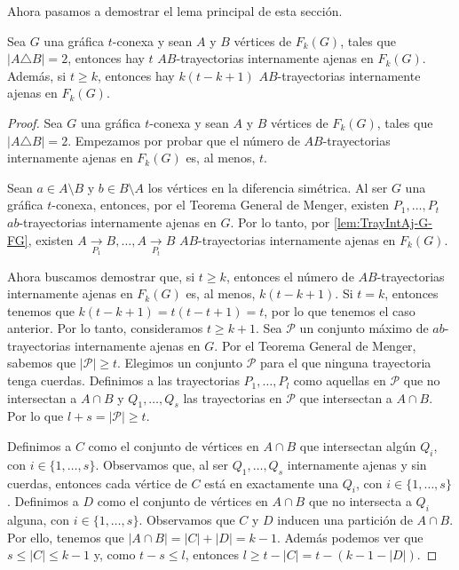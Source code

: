 Ahora pasamos a demostrar el lema principal de esta secci\'on.

\begin{lema}%
\label{lem:TrayIntAj}
    Sea $G$ una gr\'afica $t$-conexa y sean $A$ y $B$ v\'ertices de $F_{k}(G)$,
    tales que $|A \triangle B| = 2$, entonces hay $t$ $AB$-trayectorias
    internamente ajenas en $F_{k}(G)$. Adem\'as, si $t \geq k$, entonces hay
    $k(t- k + 1)$ $AB$-trayectorias internamente ajenas en $F_{k}(G)$.
\end{lema}

\begin{proof}
    Sea $G$ una gr\'afica $t$-conexa y sean $A$ y $B$ v\'ertices de $F_{k}(G)$,
    tales que $|A \triangle B| = 2$. Empezamos por probar que el n\'umero de
    $AB$-trayectorias internamente ajenas en $F_{k}(G)$ es, al menos, $t$. 
    
    Sean $a \in A \setminus B$ y $b \in B \setminus A$ los v\'ertices en la
    diferencia sim\'etrica. Al ser $G$ una gr\'afica $t$-conexa, entonces, por
    el Teorema General de Menger, existen $P_{1}, \dots, P_{t}$
    $ab$-trayectorias internamente ajenas en $G$. Por lo tanto, por
    \cref{lem:TrayIntAj-G-FG}, existen $A \xrightarrow[P_1]{}  B, \dots, A
    \xrightarrow[P_t]{}  B$ $AB$-trayectorias internamente ajenas en $F_{k}(G)$. 

    Ahora buscamos demostrar que, si $t \geq k$, entonces el n\'umero de
    $AB$-trayectorias internamente ajenas en $F_{k}(G)$ es, al menos, $k(t- k
    +1)$. Si $t=k$, entonces tenemos que $k(t - k + 1) = t(t-t+1) = t$, por lo
    que tenemos el caso anterior. Por lo tanto, consideramos  $t \geq k + 1$.
    Sea $\mathcal{P}$ un conjunto m\'aximo de $ab$-trayectorias internamente
    ajenas en $G$. Por el Teorema General de Menger, sabemos que $|\mathcal{P}|
    \ge t$. Elegimos un conjunto $\mathcal{P}$ para el que ninguna trayectoria
    tenga cuerdas. Definimos a las trayectorias $P_{1}, \dots, P_{l}$ como
    aquellas en $\mathcal{P}$ que no intersectan a $A \cap B$ y $Q_{1}, \dots,
    Q_{s}$ las trayectorias en $\mathcal{P}$ que intersectan a $A \cap B$. Por
    lo que $l + s = |\mathcal{P}| \ge t$.

    Definimos a $C$ como el conjunto de v\'ertices en $A \cap B$ que intersectan
    alg\'un $Q_i$, con $i \in \{1, \dots, s\}$. Observamos que, al ser $Q_1,
    \dots, Q_s$ internamente ajenas y sin cuerdas, entonces cada v\'ertice de
    $C$ est\'a en exactamente una $Q_i$, con $i \in \{1, \dots, s\}$. Definimos
    a $D$ como el conjunto de v\'ertices en $A \cap B$ que no intersecta a $Q_i$
    alguna, con $i \in \{1, \dots, s\}$. Observamos que $C$ y $D$ inducen una
    partici\'on de $A \cap B$. Por ello, tenemos que $|A\cap B| = |C| + |D| =
    k-1$. Adem\'as podemos ver que $s \leq |C| \leq k-1$ y, como $ t - s \leq
    l$, entonces $l \geq t -|C| = t- (k-1-|D|)$.


\end{proof}
